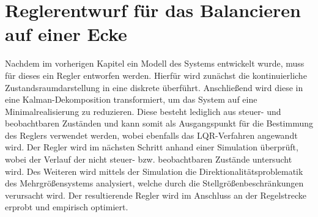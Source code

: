 \ifx\FORMAT\undefined


\fi

\chapter{Reglerentwurf für das Balancieren auf einer Ecke}\label{chapter_RT_Corner}
Nachdem im vorherigen Kapitel ein Modell des Systems entwickelt wurde, muss für dieses ein Regler entworfen werden. Hierfür wird zunächst die kontinuierliche Zustandsraumdarstellung in eine diskrete überführt. Anschließend wird diese in eine Kalman-Dekomposition transformiert, um das System auf eine Minimalrealisierung zu reduzieren. Diese besteht lediglich aus steuer- und beobachtbaren Zuständen und kann somit als Ausgangspunkt für  die Bestimmung des Reglers verwendet werden, wobei ebenfalls das LQR-Verfahren angewandt wird. Der Regler wird im nächsten Schritt anhand einer Simulation überprüft, wobei der Verlauf der nicht steuer- bzw. beobachtbaren Zustände untersucht wird. Des Weiteren wird mittels der Simulation die Direktionalitätsproblematik des Mehrgrößensystems analysiert, welche durch die Stellgrößenbeschränkungen verursacht wird. Der resultierende Regler wird im Anschluss an der Regelstrecke erprobt und empirisch optimiert.

\newpage

\newpage

\newpage


\ifx\FORMAT\undefined

\fi

